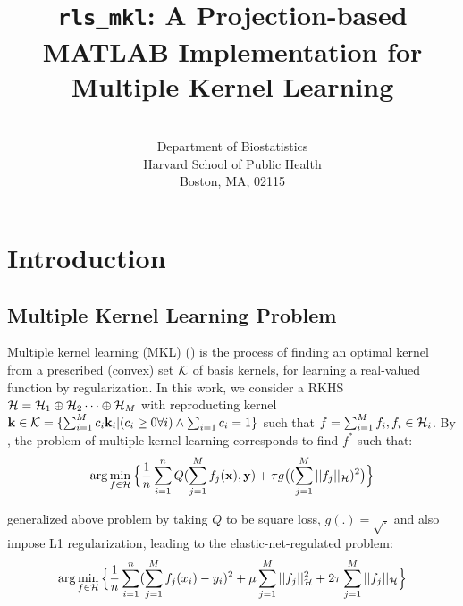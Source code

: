 \documentclass[tablecaption=bottom,wcp]{jmlr} %
\title{{\tt rls\_mkl}: A Projection-based MATLAB Implementation for Multiple Kernel Learning}
\author{\Name{(Jeremiah) Zhe Liu} \Email{zhl112@mail.harvard.edu}\\
   \addr Department of Biostatistics\\
   Harvard School of Public Health\\
   Boston, MA, 02115}
\begin{document}
\maketitle
\vspace*{-4em}
\tableofcontents



\newpage
\section{Introduction}
\subsection{Multiple Kernel Learning Problem}

Multiple kernel learning (MKL) (\citet{jordan-mkl-2004}) is the process of finding an optimal kernel
from a prescribed (convex) set ${\cal K}$ of basis kernels, for learning a real-valued function by regularization. In this work, we consider a RKHS ${\cal H} = {\cal H}_1 \oplus {\cal H}_2 \dots \oplus {\cal H}_M$ with reproducting kernel ${\bf k} \in {\cal K} = \{\sum_{i=1}^M c_i{\bf k}_i | ( c_i \geq 0 \forall i) \wedge \sum_{i=1} c_i = 1 \}$ such that $f = \sum_{i=1}^M f_i, f_i \in {\cal H}_i$. By \citet{micchelli-convex-2005}, the problem of multiple kernel learning corresponds to find $f^*$ such that:
\begin{align*}
\arg \min_{f \in {\cal H}} \Big\{
\frac{1}{n} \sum_{i=1}^n Q(\sum_{j=1}^M f_j({\bf x}), {\bf y}) + 
\tau g \big( (\sum_{j=1}^M ||f_j||_{\cal H} )^2  \big)
\Big\}
\end{align*}

\citet{rosasco-prox-2009} generalized above problem by taking $Q$ to be square loss, $g(.) = \sqrt{.}$ and also impose L1 regularization, leading to the elastic-net-regulated problem:
\begin{align}\label{eq:primal}
\arg \min_{f \in {\cal H}} \Big\{
\frac{1}{n} \sum_{i=1}^n (\sum_{j=1}^M f_j(x_i) - y_i)^2 + 
\mu \sum_{j=1}^M ||f_j||^2_{\cal H} +
2\tau \sum_{j=1}^M ||f_j||_{\cal H} \Big\}
\end{align}
\end{document}

